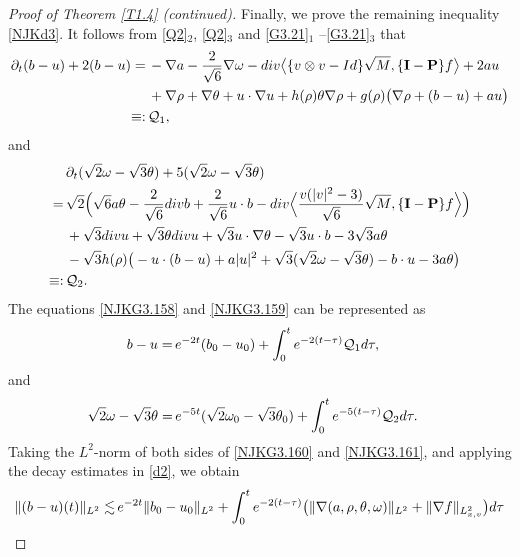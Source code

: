 \documentclass[10pt,a4paper]{amsart}
\begin{document}
\begin{proof}[Proof of Theorem \ref{T1.4} \emph{(}continued\emph{)}]
 \medskip 
 Finally, we prove the remaining inequality \eqref{NJKd3}. 
 It follows  from \eqref{Q2}$_2$, \eqref{Q2}$_3$ and 
\eqref{G3.21}$_1$ \linebreak  –\eqref{G3.21}$_3$ that
\begin{align}\label{NJKG3.158}
 \partial_t (b-u)+2(b-u) 
=\,&  -\nabla a-\frac{2}{\sqrt{6}}\nabla\omega-{\rm div}
\big\langle\{ v\otimes v-{\rm Id}\} \sqrt{M},\{\mathbf{I}-\mathbf{P}\}f               
    \big\rangle+2au\nonumber\\
&+\nabla \rho+\nabla\theta  +u\cdot\nabla u
+h(\rho)\theta\nabla\rho +g(\rho)  \big(  \nabla\rho +(b-u)+au\big)\nonumber\\
\equiv:\,& \mathcal{Q}_1, 
\end{align}
and
\begin{align}\label{NJKG3.159}
&\partial_t(\sqrt{2}\omega-\sqrt{3}\theta)+5(\sqrt{2}\omega-\sqrt{3}\theta)\nonumber\\ 
=\,& \sqrt{2}\Big(\sqrt{6}a\theta-\frac{2}{\sqrt{6}}{\rm div}b
+\frac{2}{\sqrt{6}}u\cdot b-{\rm div} \Big\langle \frac{v(|v|^2-3)}{\sqrt{6}}\sqrt{M}, 
\{\mathbf{I}-\mathbf{P}\}f   \Big\rangle   \Big)\nonumber\\
&+\sqrt{3}{\rm div}u+\sqrt{3}\theta{\rm div}u
+\sqrt{3} u\cdot\nabla\theta-\sqrt{3} u\cdot b-3\sqrt{3}a\theta\nonumber\\
&-\sqrt{3} h(\rho) \big( -u\cdot(b-u) +a|u|^2 
+\sqrt{3}(\sqrt{2}\omega-\sqrt{3}\theta)-b\cdot u-3a\theta      \big)  \nonumber\\
\equiv:\,& \mathcal{Q}_2.
\end{align}
The equations \eqref{NJKG3.158} and \eqref{NJKG3.159} can be represented as %
\begin{align}\label{NJKG3.160}
b-u=&\, e^{-2t}(b_0-u_0)+\int_{0}^t e^{-2(t-\tau)} \mathcal{Q}_1{\rm d}\tau,    
\end{align}
and
\begin{align}\label{NJKG3.161}
\sqrt{2}\omega-\sqrt{3}\theta=&\, e^{-5t}(\sqrt{2}\omega_0-\sqrt{3}\theta_0)
+\int_{0}^t e^{-5(t-\tau)} \mathcal{Q}_2{\rm d}\tau.   
\end{align} 
Taking the $L^2$-norm of both sides of \eqref{NJKG3.160} and \eqref{NJKG3.161}, and applying 
the decay estimates in \eqref{d2}, we obtain   
\begin{align}\label{NJKG3.162}
\|(b-u)(t)\|_{L^2}\lesssim&\, e^{-2t} \|b_0-u_0\|_{L^2}+\int_0^t e^{-2(t-\tau)}
\big(\|\nabla(a,\rho,\theta,\omega)\|_{L^2}+\|\nabla f\|_{L_{x,v}^2}\big)  {\rm d}\tau\nonumber\\

\end{align}
\end{proof}
\end{document}

